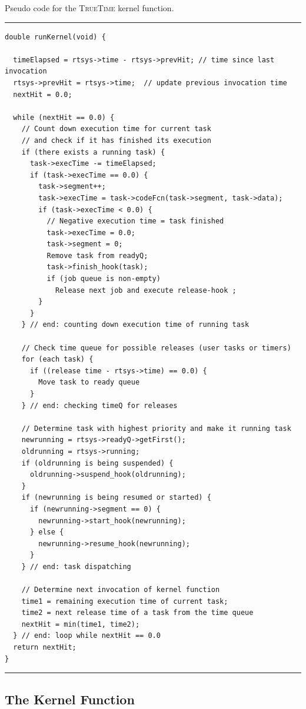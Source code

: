 \documentclass[final,twoside]{rapport}
\begin{document}
\begin{listing}[tb]\small
\caption{Pseudo code for the \textsc{TrueTime} kernel function.}
\label{list:runkernel}
\vspace{3mm}
\hrule
\begin{verbatim}
double runKernel(void) {
  
  timeElapsed = rtsys->time - rtsys->prevHit; // time since last invocation
  rtsys->prevHit = rtsys->time;  // update previous invocation time
  nextHit = 0.0;

  while (nextHit == 0.0) {
    // Count down execution time for current task 
    // and check if it has finished its execution 
    if (there exists a running task) {
      task->execTime -= timeElapsed;
      if (task->execTime == 0.0) {
        task->segment++;
        task->execTime = task->codeFcn(task->segment, task->data);
        if (task->execTime < 0.0) { 
          // Negative execution time = task finished
          task->execTime = 0.0;
          task->segment = 0;
          Remove task from readyQ;
          task->finish_hook(task);
          if (job queue is non-empty)
            Release next job and execute release-hook ;
        }
      }
    } // end: counting down execution time of running task

    // Check time queue for possible releases (user tasks or timers)
    for (each task) {
      if ((release time - rtsys->time) == 0.0) {
        Move task to ready queue
      }
    } // end: checking timeQ for releases

    // Determine task with highest priority and make it running task
    newrunning = rtsys->readyQ->getFirst();
    oldrunning = rtsys->running;
    if (oldrunning is being suspended) {
      oldrunning->suspend_hook(oldrunning);
    }
    if (newrunning is being resumed or started) {
      if (newrunning->segment == 0) {
        newrunning->start_hook(newrunning);
      } else {
        newrunning->resume_hook(newrunning);
      }
    } // end: task dispatching
    
    // Determine next invocation of kernel function
    time1 = remaining execution time of current task;
    time2 = next release time of a task from the time queue
    nextHit = min(time1, time2);
  } // end: loop while nextHit == 0.0 
  return nextHit;
}
\end{verbatim}
\hrule
\end{listing}

\subsection{The Kernel Function}
\end{document}
